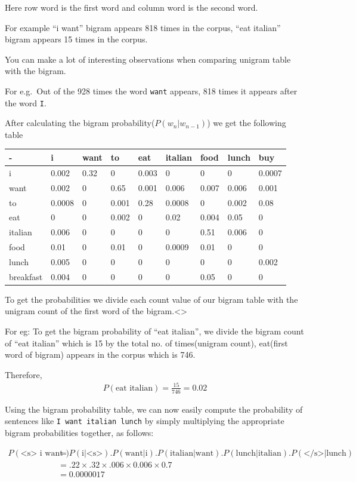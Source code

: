 \documentclass[11pt]{article}
\begin{document}
Here row word is the first word and column word is the second word.

For example ``i want'' bigram appears 818 times in the corpus, ``eat
italian'' bigram appears 15 times in the corpus.

You can make a lot of interesting observations when comparing unigram
table with the bigram.

For e.g.~Out of the 928 times the word \texttt{want} appears, 818 times
it appears after the word \texttt{I}.

After calculating the bigram probability(\(P(w_n |w_{n−1} )\)) we get
the following table

\begin{longtable}[]{@{}lllllllll@{}}
\toprule
- & i & want & to & eat & italian & food & lunch & buy\tabularnewline
\midrule
\endhead
i & 0.002 & 0.32 & 0 & 0.003 & 0 & 0 & 0 & 0.0007\tabularnewline
want & 0.002 & 0 & 0.65 & 0.001 & 0.006 & 0.007 & 0.006 &
0.001\tabularnewline
to & 0.0008 & 0 & 0.001 & 0.28 & 0.0008 & 0 & 0.002 &
0.08\tabularnewline
eat & 0 & 0 & 0.002 & 0 & 0.02 & 0.004 & 0.05 & 0\tabularnewline
italian & 0.006 & 0 & 0 & 0 & 0 & 0.51 & 0.006 & 0\tabularnewline
food & 0.01 & 0 & 0.01 & 0 & 0.0009 & 0.01 & 0 & 0\tabularnewline
lunch & 0.005 & 0 & 0 & 0 & 0 & 0 & 0 & 0.002\tabularnewline
breakfast & 0.004 & 0 & 0 & 0 & 0 & 0.05 & 0 & 0\tabularnewline
\bottomrule
\end{longtable}

To get the probabilities we divide each count value of our bigram table
with the unigram count of the first word of the
bigram.\textless{}\center\textgreater{}

 For eg: To get the bigram probability of ``eat italian'', we divide the
bigram count of ``eat italian'' which is 15 by the total no. of
times(unigram count), eat(first word of bigram) appears in the corpus
which is 746.

Therefore,
\[ \begin{align} P(\text{eat italian}) = \frac{15}{746}= 0.02\end{align}\]

Using the bigram probability table, we can now easily compute the
probability of sentences like \texttt{I\ want\ italian\ lunch} by simply
multiplying the appropriate bigram probabilities together, as follows:

\[\begin{align}
P(\text{<s> i want italian lunch </s>})
&= P(\text{i|<s>}).P(\text{want|i}).P(\text{italian|want}).P(\text{lunch|italian}).P(\text{</s>|lunch}) \\
&= .22 \times .32 \times .006 \times 0.006 \times 0.7 \\
&= 0.0000017
\end{align}
\]
\end{document}
